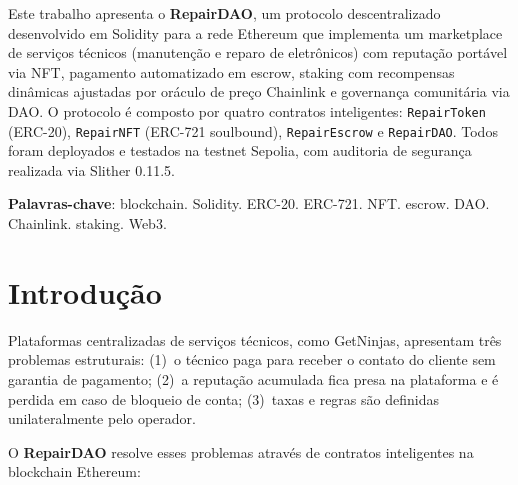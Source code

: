 \documentclass[
    12pt,
    a4paper,
    oneside,
    brazil,
    sumario=tradicional
]{abntex2}
\begin{document}
\frenchspacing

\pretextual

\imprimircapa

\imprimirfolhaderosto

\begin{resumo}
Este trabalho apresenta o \textbf{RepairDAO}, um protocolo descentralizado
desenvolvido em Solidity para a rede Ethereum que implementa um marketplace
de serviços técnicos (manutenção e reparo de eletrônicos) com reputação
portável via NFT, pagamento automatizado em escrow, staking com recompensas
dinâmicas ajustadas por oráculo de preço Chainlink e governança comunitária
via DAO. O protocolo é composto por quatro contratos inteligentes:
\texttt{RepairToken} (ERC-20), \texttt{RepairNFT} (ERC-721 soulbound),
\texttt{RepairEscrow} e \texttt{RepairDAO}. Todos foram deployados e testados
na testnet Sepolia, com auditoria de segurança realizada via Slither 0.11.5.

\vspace{\onelineskip}
\noindent\textbf{Palavras-chave}: blockchain. Solidity. ERC-20. ERC-721. NFT.
escrow. DAO. Chainlink. staking. Web3.
\end{resumo}

\tableofcontents*

\cleardoublepage

\textual

\section{Introdução}

Plataformas centralizadas de serviços técnicos, como GetNinjas,
apresentam três problemas estruturais: (1)~o técnico paga para receber o
contato do cliente sem garantia de pagamento; (2)~a reputação acumulada
fica presa na plataforma e é perdida em caso de bloqueio de conta;
(3)~taxas e regras são definidas unilateralmente pelo operador.

O \textbf{RepairDAO} resolve esses problemas através de contratos
inteligentes na blockchain Ethereum:
\end{document}
